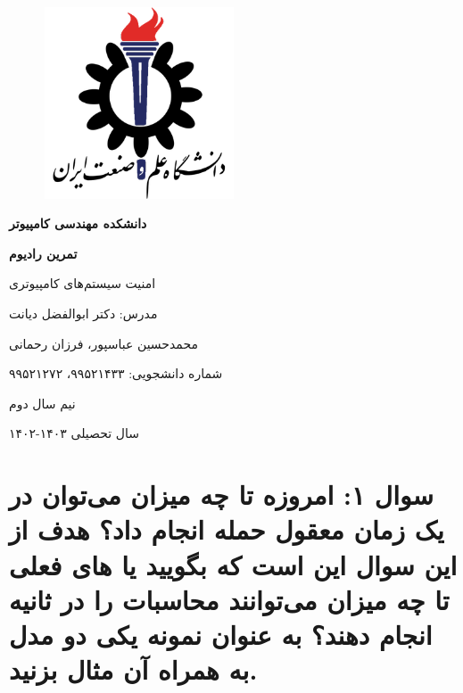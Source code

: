 \documentclass{article}
\begin{document}
\begin{titlepage}
    \centering
    \begin{figure}[ht]
        \centering
        \includegraphics[width=0.5\textwidth]{iust.png}
    \end{figure}
    \vspace{1cm}
    {\scshape\Huge \textbf{دانشکده مهندسی کامپیوتر} \par}
    \vspace{1cm}
    {\huge\bfseries تمرین رادیوم  \par}
    \vspace{1cm}
    {\Large امنیت سیستم‌های کامپیوتری \par}
    \vspace{1cm}
	{\LARGE  مدرس: دکتر ابوالفضل دیانت\par}
    \vspace{1cm}
    {\LARGE  محمدحسین عباسپور، فرزان رحمانی \par}
    \vspace{1cm}
    {\LARGE شماره دانشجویی: ۹۹۵۲۱۴۳۳، ۹۹۵۲۱۲۷۲ \par}
    \vspace{1.22cm}
    {\large نیم سال دوم \par}
    {\large سال تحصیلی ۱۴۰۳-۱۴۰۲ \par}
\end{titlepage}
\newpage
\doublespacing
\singlespacing
\newpage
{}
\section*{سوال ۱: امروزه تا چه میزان می‌توان در یک زمان معقول حمله  انجام داد؟ هدف از این سوال این است که بگویید  یا های فعلی تا چه میزان می‌توانند محاسبات را در ثانیه انجام دهند؟ به عنوان نمونه یکی دو مدل به همراه  آن مثال بزنید.} 
\leavevmode \\
\end{document}
